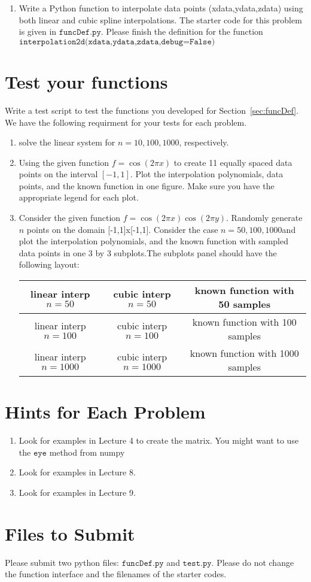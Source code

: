 \documentclass[11pt]{article}
\begin{document}
\begin{enumerate}
\item Write a Python function to interpolate data points (xdata,ydata,zdata) using
 both linear and cubic spline interpolations.
  The starter code for this problem is given in $\texttt{funcDef.py}$. Please finish the definition for the function $\texttt{interpolation2d(xdata,ydata,zdata,debug=False)}$


\end{enumerate}

\section{Test your functions}
Write a test script to test the functions you developed for Section~\ref{sec:funcDef}. We have the following requirment for your tests for each problem.
\begin{enumerate}
\item solve the linear system for $n=10,100,1000$, respectively.
\item Using the given function
  $
  f=\cos(2\pi x)
  $
  to create  11 equally spaced data points on the interval $[-1,1]$.    Plot the interpolation polynomials, data points, and the known function in one figure. Make sure you have the appropriate legend for each plot.
  \item  Consider the given function
  $
  f=\cos(2\pi x)\cos(2\pi y)
  $. Randomly generate $n$ points on the domain [-1,1]x[-1,1]. Consider the case $n=50,100,  1000$and plot the interpolation polynomials, and the known function with sampled data points  in one 3 by 3 subplots.The subplots panel should have the following layout:
  \begin{table}[h]
    \centering
    \begin{tabular}{|c|c|c|}
      \hline
      linear interp  $n=50$ & cubic interp  $n=50$ &  known function with  50 samples\\      \hline
      linear interp  $n=100$ & cubic interp  $n=100$ &  known function with  100 samples\\      \hline
            linear interp  $n=1000$ & cubic interp  $n=1000$ &  known  function with 1000 samples\\      \hline
    \end{tabular}
  \end{table}

\end{enumerate}

\section{Hints for Each Problem}
\begin{enumerate}
\item Look for examples in Lecture 4 to create the matrix. You might want to use the $\texttt{eye}$ method from numpy
\item Look for examples in Lecture 8.
  \item Look for examples in Lecture 9.
\end{enumerate}


\section{Files to Submit}
Please submit two python files: $\texttt{funcDef.py}$ and $\texttt{test.py}$.
Please do not change the function interface and the filenames of the starter codes.
\end{document}

